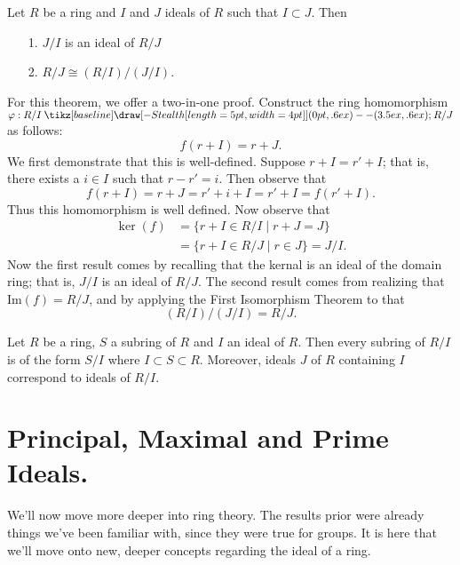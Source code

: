\documentclass[12pt,letterpaper]{algebra_book}
\renewcommand{\to}{\mathbin{\tikz[baseline] \draw[-{Stealth[length=5pt,width=4pt]}] (0pt,.6ex) -- (3.5ex,.6ex);}}
\newcommand{\im}{\mbox{Im}}
\renewcommand{\phi}{\varphi}
\theoremstyle{definition}
\begin{document}
    \begin{thm}
        Let $R$ be a ring and $I$ and $J$ ideals of $R$ such
        that $I \subset J$. Then 
        \begin{itemize}
            \item[1.] $J/I$ is an ideal of $R/J$ 
            \item[2.] $R/J \cong (R/I)/(J/I)$. 
        \end{itemize}
    \end{thm}

    \begin{prf}
        For this theorem, we offer a two-in-one proof. 
        Construct the ring homomorphism $\phi:R/I \to R/J$ as
        follows: 
        \[
            f(r + I) = r + J.
        \]
        We first demonstrate that this is well-defined. Suppose $r
        + I = r' + I$; that is, there exists a $i \in I$ such that
        $r - r' = i$. Then observe that 
        \[
            f(r + I) = r + J = r' + i + I = r' + I = f(r' + I).
        \]
        Thus this homomorphism is well defined. Now observe that 
        \begin{align*}
            \ker(f) &= \{r + I \in R/I \mid r + J = J\}\\ 
            &= \{r + I \in R/J \mid r \in J\} = J/I.
        \end{align*}
        Now the first result comes by recalling that the kernal is
        an ideal of the domain ring; that is, $J/I$ is an ideal of
        $R/J$. The second result comes from realizing that $\im(f)
        = R/J$, and by applying the First Isomorphism Theorem to
        that 
        \[
            (R/I)/(J/I) = R/J.
        \]
    \end{prf}

    \begin{thm}
        Let $R$ be a ring, $S$ a subring of $R$ and $I$ an ideal of $R$. Then every
        subring of $R/I$ is of the form $S/I$ where $I \subset S
        \subset R$. Moreover, ideals $J$ of $R$ containing $I$
        correspond to ideals of $R/I$.
    \end{thm}

    \newpage
    \section{Principal, Maximal and Prime Ideals.}
    We'll now move more deeper into ring theory. The results
    prior were already things we've been familiar with, since they
    were true for groups. It is here that we'll move onto new,
    deeper concepts regarding the ideal of a ring. 
\end{document}
